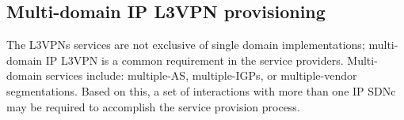 \documentclass[10pt, conference]{IEEEtran}
\begin{document}




\subsection{Multi-domain IP L3VPN provisioning}
\label{section:muli-l3nm}

The L3VPNs services are not exclusive of single domain implementations; multi-domain IP L3VPN is a common requirement in the service providers. Multi-domain services include: multiple-AS, multiple-IGPs, or multiple-vendor segmentations. Based on this, a set of interactions with more than one IP SDNc may be required to accomplish the service provision process.
\end{document}
